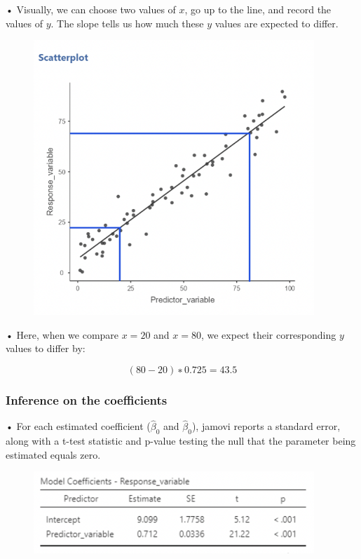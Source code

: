 \documentclass[
  letterpaper,
  DIV=11,
  numbers=noendperiod]{scrreprt}
\begin{document}
• Visually, we can choose two values of \(x\), go up to the line, and
record the values of \(y\). The slope tells us how much these \(y\)
values are expected to differ.

\begin{figure}

{\centering \includegraphics[width=4.16667in,height=\textheight]{images/Mod2_pt1_4.png}

}

\end{figure}

• Here, when we compare \(x = 20\) and \(x = 80\), we expect their
corresponding \(y\) values to differ by:

\[
(80 − 20) ∗ 0.725 = 43.5
\]

\hypertarget{inference-on-the-coefficients}{%
\subsubsection{Inference on the
coefficients}\label{inference-on-the-coefficients}}

• For each estimated coefficient (\(\hat{\beta}_0\) and
\(\hat{\beta}_0\)), jamovi reports a standard error, along with a t-test
statistic and p-value testing the null that the parameter being
estimated equals zero.

\begin{figure}

{\centering \includegraphics[width=4.16667in,height=\textheight]{images/Mod2_pt1_5.png}

}

\end{figure}
\end{document}
